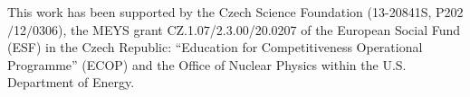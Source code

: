 \documentclass{svjour3}                     %
\begin{document}
\begin{acknowledgements}
This work has been supported by the Czech Science Foundation
(13-20841S, P202$/$12$/$0306),  the MEYS grant CZ.1.07/2.3.00/20.0207 of the European Social Fund (ESF) in the Czech Republic: “Education for Competitiveness Operational Programme” (ECOP) and the Office of Nuclear Physics within the U.S. Department of Energy.  
\end{acknowledgements}

{}

\end{document}
